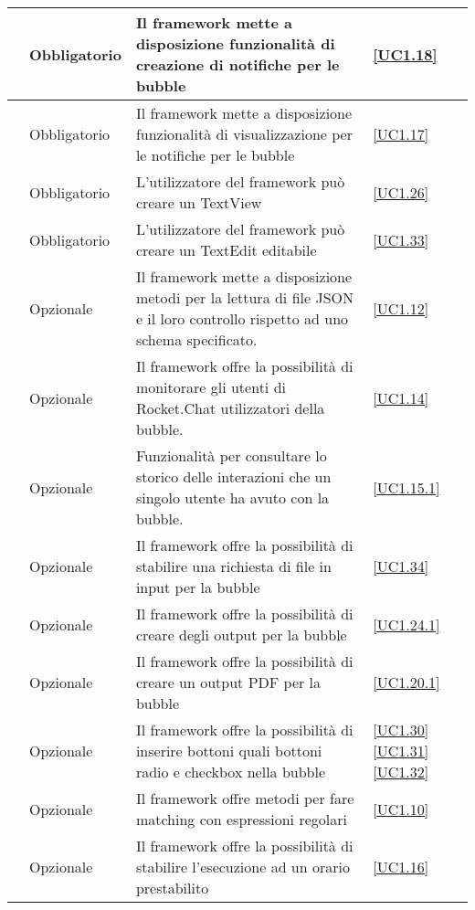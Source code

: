 \begin{longtable}{|P{1.5cm}|P{2.5cm}|P{6.5cm}|P{2.5cm}|}
	\hline \RequisitoObF\label{L15} & Obbligatorio & Il framework mette a disposizione funzionalità di creazione di notifiche per le bubble & \ref{UC1.18} \\
	\hline \RequisitoObF\label{L16} & Obbligatorio & Il framework mette a disposizione funzionalità di visualizzazione per le notifiche per le bubble & \ref{UC1.17} \\
	\hline \RequisitoObF\label{L33} & Obbligatorio & L'utilizzatore del framework può creare un TextView & \ref{UC1.26} \\
	\hline \RequisitoObF\label{L34} & Obbligatorio & L'utilizzatore del framework può creare un TextEdit editabile & \ref{UC1.33} \\
	\hline \RequisitoOpF\label{L35} & Opzionale & Il framework mette a disposizione metodi per la lettura di file JSON e il loro controllo rispetto ad uno schema specificato. & \ref{UC1.12} \\
	\hline \RequisitoOpF\label{L36} & Opzionale & Il framework offre la possibilità di monitorare gli utenti di Rocket.Chat utilizzatori della bubble. & \ref{UC1.14} \\
	\hline \RequisitoOpF\label{L37} & Opzionale & Funzionalità per consultare lo storico delle interazioni che un singolo utente ha avuto con la bubble. & \ref{UC1.15.1} \\
	\hline \RequisitoOpF\label{L38} & Opzionale & Il framework offre la possibilità di stabilire una richiesta di file in input per la bubble & \ref{UC1.34} \\
	\hline \RequisitoOpF\label{L39} & Opzionale & Il framework offre la possibilità di creare degli output per la bubble & \ref{UC1.24.1} \\
	\hline \RequisitoOpF\label{L40} & Opzionale & Il framework offre la possibilità di creare un output PDF per la bubble & \ref{UC1.20.1} \\	
	\hline \RequisitoOpF\label{L41} & Opzionale & Il framework offre la possibilità di inserire bottoni quali bottoni radio e checkbox nella bubble & \ref{UC1.30} \linebreak \ref{UC1.31} \linebreak \ref{UC1.32} \\
	\hline \RequisitoOpF\label{L42} & Opzionale & Il framework offre metodi per fare matching con espressioni regolari
	 & \ref{UC1.10} \\
	\hline \RequisitoOpF\label{L43} & Opzionale & Il framework offre la possibilità di stabilire l'esecuzione ad un orario prestabilito & \ref{UC1.16} \\

\end{longtable}
